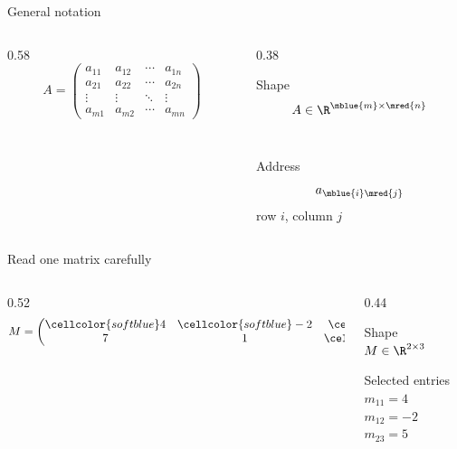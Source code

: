 \begin{frame}{General notation}
  \begin{columns}[T,onlytextwidth]
    \begin{column}{0.58\textwidth}
      \[
      A=\begin{pmatrix}
      a_{11}&a_{12}&\cdots&a_{1n}\\
      a_{21}&a_{22}&\cdots&a_{2n}\\
      \vdots&\vdots&\ddots&\vdots\\
      a_{m1}&a_{m2}&\cdots&a_{mn}
      \end{pmatrix}
      \]
    \end{column}
    \begin{column}{0.38\textwidth}
      \begin{block}{Shape}
        \[
        A\in\R^{\mblue{m}\times\mred{n}}
        \]
        \\
      \end{block}
      \begin{exampleblock}{Address}
        \[
        a_{\mblue{i}\mred{j}}
        \]
        row $i$, column $j$
      \end{exampleblock}
    \end{column}
  \end{columns}
\end{frame}

\begin{frame}{Read one matrix carefully}
  \begin{columns}[T,onlytextwidth]
    \begin{column}{0.52\textwidth}
      \[
      M=\begin{pmatrix}
      \cellcolor{softblue}4&\cellcolor{softblue}-2&\cellcolor{softblue}0\\
      7&1&\cellcolor{softgreen}5
      \end{pmatrix}
      \]
    \end{column}
    \begin{column}{0.44\textwidth}
      \begin{block}{Shape}
        $M\in\R^{2\times3}$
      \end{block}
      \begin{exampleblock}{Selected entries}
        $m_{11}=4$\\
        $m_{12}=-2$\\
        $m_{23}=5$
      \end{exampleblock}
    \end{column}
  \end{columns}

  \vspace{0.35cm}
\end{frame}
